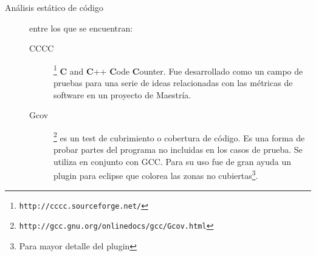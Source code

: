 \begin{description}
\item [Análisis estático de código] entre los que se encuentran:

\begin{description}

\item [CCCC]\footnote{\texttt{http://cccc.sourceforge.net/}} \textbf{C} and \textbf{C}++ \textbf{C}ode \textbf{C}ounter. Fue desarrollado como un campo de pruebas para una serie de ideas relacionadas con las métricas de software en un proyecto de Maestría.

\item [Gcov]\footnote{\texttt{http://gcc.gnu.org/onlinedocs/gcc/Gcov.html}} es un test de cubrimiento o cobertura de código. Es una forma de probar partes del programa no incluidas en los casos de prueba. Se utiliza en conjunto con GCC. Para su uso fue de gran ayuda un plugin para eclipse que colorea las zonas no cubiertas\footnote{Para mayor detalle del plugin }.
\end{description}

\end{description}